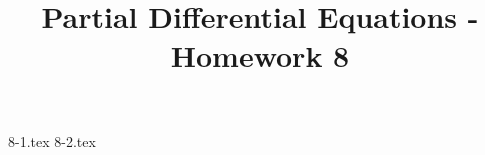 \documentclass{article}
\begin{document}
\title{Partial Differential Equations - Homework 8}
\maketitle
\begin{enumerate}
  {8-1.tex}
  \setcounter{equation}{0}
  \newpage
  {8-2.tex}
\end{enumerate}
\end{document}

